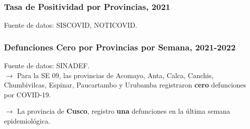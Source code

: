 \documentclass[xcolor=table]{beamer}
\begin{document}
	\begin{frame}
		\frametitle{Tasa de Positividad por Provincias, 2021}
		\vspace{-.5cm}
		
		\begin{table}[]
			\resizebox{\textwidth}{!}{%
				
			}
		\end{table}	
		{\tiny Fuente de datos: SISCOVID, NOTICOVID.}
		
	\end{frame}
	
	\begin{frame}
		\frametitle{Defunciones Cero por Provincias por Semana, 2021-2022}
		\vspace{-.5cm}
		
		\begin{table}[]
			\resizebox{\textwidth}{!}{%
				
			}
		\end{table}	
		{\tiny Fuente de datos: SINADEF. \\}
		\vspace{0.5cm}
		$\rightarrow$ Para la SE 09, las provincias de Acomayo, Anta, Calca, Canchis, Chumbivilcas, Espinar, Paucartambo y Urubamba registraron \textbf{\color{mycolor5}cero} defunciones por COVID-19.
					
		$\rightarrow$ La provincia de \textbf{\color{mycolor5}Cusco}, registro \textbf{\color{mycolor5}una} defunciones en la última semana epidemiológica.	
		
	\end{frame}
	
\end{document}
